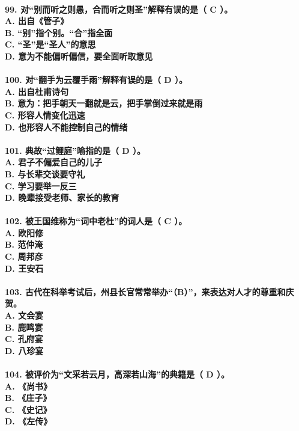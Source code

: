 \documentclass[UTF8]{ctexart} %
\begin{document}
\paragraph{
99. 对“别而听之则愚，合而听之则圣”解释有误的是（ \color{red}C\color{black} ）。 \\
    A. 出自《管子》 \\
    B. “别”指个别。“合”指全面 \\
    C. “圣”是“圣人”的意思 \\
    D. 意为不能偏听偏信，要全面听取意见
}
\paragraph{
100. 对“翻手为云覆手雨”解释有误的是（ \color{red}D\color{black} ）。 \\
    A. 出自杜甫诗句 \\
    B. 意为：把手朝天一翻就是云，把手掌倒过来就是雨 \\
    C. 形容人情变化迅速 \\
    D. 也形容人不能控制自己的情绪
}
\paragraph{
101. 典故“过鲤庭”喻指的是（ \color{red}D\color{black} ）。 \\
    A. 君子不偏爱自己的儿子 \\
    B. 与长辈交谈要守礼 \\
    C. 学习要举一反三 \\
    D. 晚辈接受老师、家长的教育
}
\paragraph{
102. 被王国维称为“词中老杜”的词人是（ \color{red}C\color{black} ）。 \\
    A. 欧阳修 \\
    B. 范仲淹 \\
    C. 周邦彦 \\
    D. 王安石
}
\paragraph{
103. 古代在科举考试后，州县长官常常举办“（\color{red}B\color{black}）”，来表达对人才的尊重和庆贺。 \\
    A. 文会宴 \\
    B. 鹿鸣宴 \\
    C. 孔府宴 \\
    D. 八珍宴
}
\paragraph{
104. 被评价为“文采若云月，高深若山海”的典籍是（ \color{red}D\color{black} ）。 \\
    A. 《尚书》 \\
    B. 《庄子》 \\
    C. 《史记》 \\
    D. 《左传》
}
\end{document}
